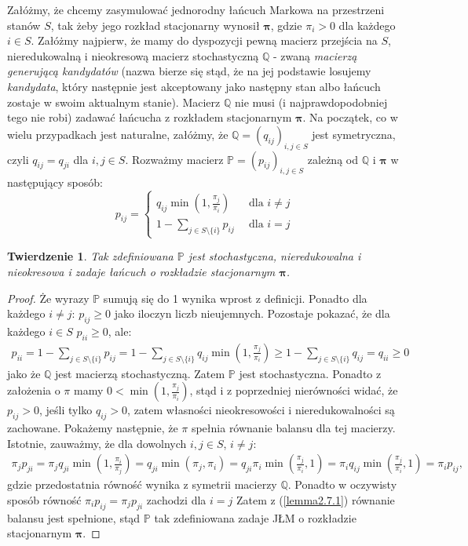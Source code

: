\documentclass[a4paper]{article}
\theoremstyle{defn}
\theoremstyle{theorem}
\newtheorem{theorem}[defn]{Twierdzenie}
\theoremstyle{lemma}
\theoremstyle{cor}
\theoremstyle{fact}
\begin{document}
Załóżmy, że chcemy zasymulować jednorodny łańcuch Markowa na przestrzeni stanów $S$, tak żeby jego rozkład stacjonarny wynosił $\boldsymbol{\pi}$, gdzie $\pi_i > 0$ dla każdego $i \in S$. Załóżmy najpierw, że mamy do dyspozycji pewną macierz przejścia na $S$, nieredukowalną i nieokresową macierz stochastyczną $\mathbb{Q}$ - zwaną \textit{macierzą generującą kandydatów} (nazwa bierze się stąd, że na jej podstawie losujemy \textit{kandydata}, który następnie jest akceptowany jako następny stan albo łańcuch zostaje w swoim aktualnym stanie). Macierz $\mathbb{Q}$ nie musi (i najprawdopodobniej tego nie robi) zadawać łańcucha z rozkładem stacjonarnym $\boldsymbol{\pi}$. Na początek, co w wielu przypadkach jest naturalne, załóżmy, że $\mathbb{Q} = (q_{ij})_{i,j \in S}$ jest symetryczna, czyli $q_{ij} = q_{ji}$ dla $i,j \in S$. Rozważmy macierz $\mathbb{P} = (p_{ij})_{i,j \in S}$ zależną od $\mathbb{Q}$ i $\boldsymbol{\pi}$ w następujący sposób:
$$
    p_{ij} = \begin{cases} q_{ij} \min(1, \frac{\pi_j}{\pi_i}) \,\,\,&\text{dla $i \neq j$}\\
                    1 - \sum\limits_{j \in S \setminus \{i\}} p_{ij}\,\,\, &\text{dla $i = j$}
            \end{cases}
$$
\begin{theorem}\label{theorem3.3.1}
Tak zdefiniowana $\mathbb{P}$ jest stochastyczna, nieredukowalna i nieokresowa i zadaje łańcuch o rozkładzie stacjonarnym $\boldsymbol{\pi}$.
\end{theorem}
\begin{proof}
Że wyrazy $\mathbb{P}$ sumują się do 1 wynika wprost z definicji. Ponadto dla każdego $i \neq j$: $p_{ij} \geq 0$ jako iloczyn liczb nieujemnych. Pozostaje pokazać, że dla każdego $i \in S$ $p_{ii} \geq 0$, ale:
\begin{align*}
    p_{ii} = 1 - \sum\limits_{j \in S\setminus \{i\}} p_{ij} = 1 - \sum\limits_{j \in S\setminus \{i\}} q_{ij}\min(1, \frac{\pi_j}{\pi_i}) \geq 1 - \sum\limits_{j \in S\setminus \{i\}} q_{ij} = q_{ii} \geq 0
\end{align*}
jako że $\mathbb{Q}$ jest macierzą stochastyczną. Zatem $\mathbb{P}$ jest stochastyczna. Ponadto z założenia o $\pi$ mamy $0 < \min(1, \frac{\pi_j}{\pi_i})$, stąd i z poprzedniej nierówności widać, że $p_{ij} > 0$, jeśli tylko $q_{ij} > 0$, zatem własności nieokresowości i nieredukowalności są zachowane.  Pokażemy następnie, że $\pi$ spełnia równanie balansu dla tej macierzy. Istotnie, zauważmy, że dla dowolnych $i,j \in S$, $i \neq j$:
\begin{align*}
    \pi_j p_{ji} = \pi_j q_{ji} \min(1, \frac{\pi_i}{\pi_j}) =  q_{ji} \min(\pi_j, \pi_i) = q_{ji} \pi_i \min(\frac{\pi_j}{\pi_i}, 1) =  \pi_i q_{ij} \min(\frac{\pi_j}{\pi_i}, 1) = \pi_i p_{ij},
\end{align*}
gdzie przedostatnia równość wynika z symetrii macierzy $\mathbb{Q}$. Ponadto w oczywisty sposób równość $\pi_i p_{ij} = \pi_j p_{ji}$ zachodzi dla $i = j$ Zatem z (\ref{lemma2.7.1}) równanie balansu jest spełnione, stąd $\mathbb{P}$ tak zdefiniowana zadaje JŁM o rozkładzie stacjonarnym $\boldsymbol{\pi}$.
\end{proof}
\end{document}
